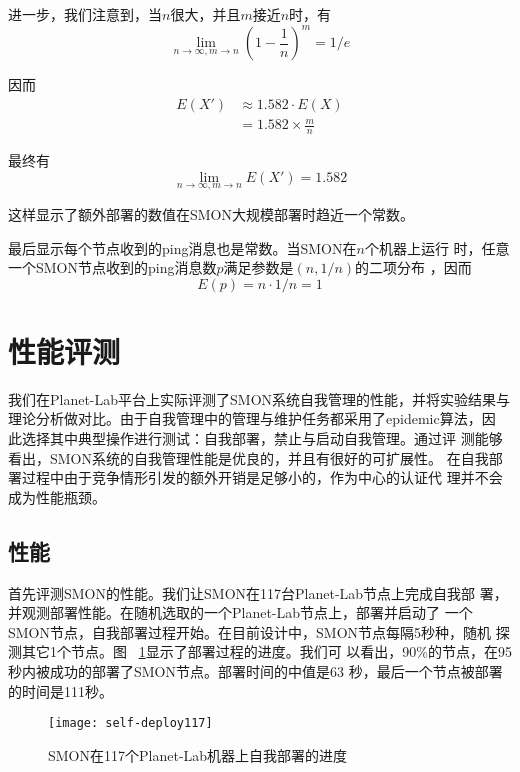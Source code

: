 进一步，我们注意到，当$n$很大，并且$m$接近$n$时，有
\begin{equation*}
\lim_{n \to \infty, m \to n} (1 - \frac{1}{n})^{m} = 1 / e
\end{equation*}

因而
\begin{equation*}
\begin{aligned}
E(X') &\approx 1.582 \cdot E(X) \\
      &= 1.582 \times \frac{m}{n}
\end{aligned}
\end{equation*}

最终有
\begin{equation*}
\lim_{n \to \infty, m \to n} E(X') = 1.582
\end{equation*}

这样显示了额外部署的数值在SMON大规模部署时趋近一个常数。

最后显示每个节点收到的ping消息也是常数。当SMON在$n$个机器上运行
时，任意一个SMON节点收到的ping消息数$p$满足参数是$(n, 1/n)$的二项分布
，因而
\begin{equation*}
E(p) = n \cdot 1/n = 1
\end{equation*}

\section{性能评测}
\label{sec:smon_eval}

我们在Planet-Lab平台上实际评测了SMON系统自我管理的性能，并将实验结果与
理论分析做对比。由于自我管理中的管理与维护任务都采用了epidemic算法，因
此选择其中典型操作进行测试：自我部署，禁止与启动自我管理。通过评
测能够看出，SMON系统的自我管理性能是优良的，并且有很好的可扩展性。
在自我部署过程中由于竞争情形引发的额外开销是足够小的，作为中心的认证代
理并不会成为性能瓶颈。

\subsection{性能}

首先评测SMON的性能。我们让SMON在117台Planet-Lab节点上完成自我部
署，并观测部署性能。在随机选取的一个Planet-Lab节点上，部署并启动了
一个SMON节点，自我部署过程开始。在目前设计中，SMON节点每隔5秒种，随机
探测其它1个节点。图~ \ref{fig:self-deploy}显示了部署过程的进度。我们可
以看出，90\%的节点，在95秒内被成功的部署了SMON节点。部署时间的中值是63
秒，最后一个节点被部署的时间是111秒。

\begin{figure}[htbp]
\centering
  \begin{minipage}{0.6\linewidth}
    \centering
    \texttt{[image: self-deploy117]}
    \caption{SMON在117个Planet-Lab机器上自我部署的进度}
    \label{fig:self-deploy}
  \end{minipage}
\end{figure}


